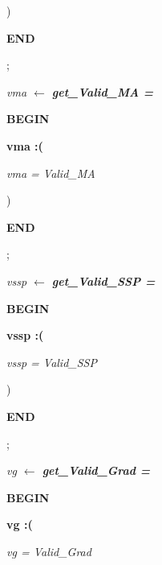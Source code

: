 \documentclass[11pt]{article}
\begin{document}
\begin{sloppypar}
\hspace*{0.60in}\rm )

\hspace*{0.20in}\bf END

\hspace*{0.20in}\rm ;

\hspace*{0.20in}

\hspace*{0.20in}\it vma  $\leftarrow$  \bf get\_Valid\_MA \rm = 

\hspace*{0.20in}\bf BEGIN

\hspace*{0.40in}\bf vma \rm :\rm (

\hspace*{0.60in}\it vma \rm = \it Valid\_MA

\hspace*{0.60in}\rm )

\hspace*{0.20in}\bf END

\hspace*{0.20in}\rm ;

\hspace*{0.20in}

\hspace*{0.20in}\it vssp  $\leftarrow$  \bf get\_Valid\_SSP \rm = 

\hspace*{0.20in}\bf BEGIN

\hspace*{0.40in}\bf vssp \rm :\rm (

\hspace*{0.60in}\it vssp \rm = \it Valid\_SSP

\hspace*{0.60in}\rm )

\hspace*{0.20in}\bf END

\hspace*{0.20in}\rm ;

\hspace*{0.20in}

\hspace*{0.20in}\it vg  $\leftarrow$  \bf get\_Valid\_Grad \rm = 

\hspace*{0.20in}\bf BEGIN

\hspace*{0.40in}\bf vg \rm :\rm (

\hspace*{0.60in}\it vg \rm = \it Valid\_Grad


\end{sloppypar}
\end{document}
